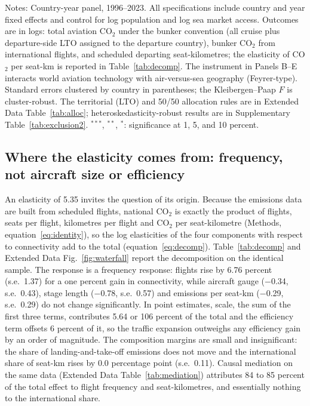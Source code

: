 \documentclass[12pt]{article}
\begin{document}
\begin{table}[H]
{\begin{threeparttable}
\begin{tabular}{lccc}
\bottomrule
\end{tabular}
\begin{tablenotes}[flushleft]
\footnotesize
\item Notes: Country-year panel, 1996--2023. All specifications include country and year fixed effects and control for log population and log sea market access. Outcomes are in logs: total aviation CO$_2$ under the bunker convention (all cruise plus departure-side LTO assigned to the departure country), bunker CO$_2$ from international flights, and scheduled departing seat-kilometres; the elasticity of CO$_2$ per seat-km is reported in Table~\ref{tab:decomp}. The instrument in Panels B--E interacts world aviation technology with air-versus-sea geography (Feyrer-type). Standard errors clustered by country in parentheses; the Kleibergen--Paap $F$ is cluster-robust. The territorial (LTO) and 50/50 allocation rules are in Extended Data Table~\ref{tab:alloc}; heteroskedasticity-robust results are in Supplementary Table~\ref{tab:exclusion2}. $^{***}$, $^{**}$, $^{*}$: significance at 1, 5, and 10 percent.
\end{tablenotes}
\end{threeparttable}}
\end{table}

\subsection*{Where the elasticity comes from: frequency, not aircraft size
or efficiency}
An elasticity of 5.35 invites the question of its origin. Because the
emissions data are built from scheduled flights, national CO$_2$ is
exactly the product of flights, seats per flight, kilometres per flight and
CO$_2$ per seat-kilometre (Methods, equation~\ref{eq:identity}), so the
log elasticities of the four components with respect to connectivity add
to the total (equation~\ref{eq:decomp}). Table~\ref{tab:decomp} and Extended Data
Fig.~\ref{fig:waterfall} report the decomposition on the identical sample.
The response is a frequency response: flights rise by 6.76 percent (s.e.\
1.37) for a one percent gain in connectivity, while aircraft gauge
($-$0.34, s.e.\ 0.43), stage length ($-$0.78, s.e.\ 0.57) and emissions
per seat-km ($-$0.29, s.e.\ 0.29) do not change significantly. In point
estimates, scale, the sum of the first three terms, contributes 5.64 or
106 percent of the total and the efficiency term offsets 6 percent of
it, so the traffic expansion outweighs any efficiency gain by an order of
magnitude. The composition margins are small and insignificant: the share
of landing-and-take-off emissions does not move and the international
share of seat-km rises by 0.0 percentage point (s.e.\ 0.11). Causal
mediation on the same data (Extended Data Table~\ref{tab:mediation})
attributes 84 to 85 percent of the total effect to flight frequency and
seat-kilometres, and essentially nothing to the international share.
\end{document}
